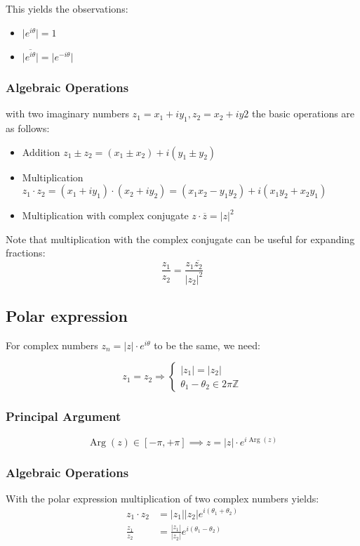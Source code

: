  
This yields the observations:
\begin{itemize}
    \item $\lvert e^{i\theta}\rvert = 1$
    \item $\overline{\lvert e^{i\theta}\rvert} = \rvert e^{-i\theta}\rvert$
\end{itemize}

\subsubsection{Algebraic Operations}
with two imaginary numbers $z_1=x_1+iy_1, z_2=x_2+iy2$ the basic operations are as follows:
\begin{itemize}
    \item {Addition} $z_1\pm z_2 = (x_1\pm x_2) + i(y_1\pm y_2)$
    \item {Multiplication} $z_1\cdot  z_2 = (x_1 + iy_1) \cdot  (x_2+i y_2) = (x_1x_2-y_1y_2)+i(x_1y_2+x_2y_1)$
    \item {Multiplication with complex conjugate} $z\cdot \overline z = \lvert z\rvert ^2$
\end{itemize}
Note that multiplication with the complex conjugate can be useful for expanding fractions: 
$$
\frac{z_1}{z_2}=\frac{z_1\overline{z_2}}{\lvert z_2\rvert ^2}
$$

\subsection{Polar expression}
For complex numbers $z_n=\lvert z\rvert \cdot e^{i\theta}$ to be the same, we need:

\begin{equation*}
z_1=z_2
\Rightarrow 
\begin{cases}
|z_1|=|z_2|\\
\theta_1-\theta_2 \in 2\pi \mathbb Z
\end{cases}
\end{equation*}
\subsubsection{Principal Argument}
$$
\operatorname{Arg}(z)\in[-\pi,+\pi]\implies z= |z| \cdot e^{i\operatorname{Arg}(z)}
$$

\subsubsection{Algebraic Operations}
With the polar expression multiplication of two complex numbers yields:
\begin{equation*}
\begin{split}
    z_1\cdot z_2 &= |z_1||z_2|e^{i(\theta_1+\theta_2)}\\
    \frac{z_1}{z_2} &= \frac{|z_1|}{|z_2|}e^{i(\theta_1-\theta_2)} 
\end{split}
\end{equation*}

